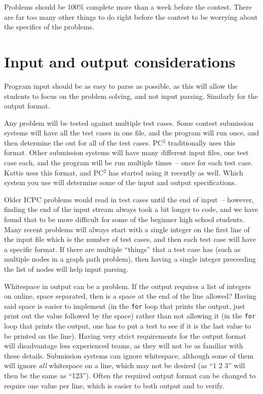 \documentclass[11pt,twoside,letterpaper]{book}
\begin{document}
Problems should be 100\% complete more than a week before the
contest. There are far too many other things to do right before the
contest to be worrying about the specifics of the problems.


\section{Input and output considerations}
\label{sec:input-types}

Program input should be as easy to parse as possible, as this will
allow the students to focus on the problem solving, and not input
parsing.  Similarly for the output format.

Any problem will be tested against multiple test cases.  Some contest
submission systems will have all the test cases in one file, and the
program will run once, and then determine the out for all of the test
cases.  PC$^2$ traditionally uses this format.  Other submission
systems will have many different input files, one test case each, and
the program will be run multiple times~-- once for each test case.
Kattis uses this format, and PC$^2$ has started using it recently as
well.  Which system you use will determine some of the input and
output specifications.

Older ICPC problems would read in test cases until the end of input~--
however, finding the end of the input stream always took a bit longer
to code, and we have found that to be more difficult for some of the
beginner high school students.  Many recent problems will always start
with a single integer on the first line of the input file which is the
number of test cases, and then each test case will have a specific
format.  If there are multiple ``things'' that a test case has (such
as multiple nodes in a graph path problem), then having a single
integer preceeding the list of nodes will help input parsing.

Whitespace in output can be a problem.  If the output requires a list
of integers on online, space separated, then is a space at the end of
the line allowed?  Having said space is easier to implement (in the
{\tt for} loop that prints the output, just print out the value
followed by the space) rather than not allowing it (in the {\tt for}
loop that prints the output, one has to put a test to see if it is the
last value to be printed on the line).  Having very strict
requirements for the output format will disadvantage less experienced
teams, as they will not be as familiar with these details.  Submission
systems can ignore whitespace, although some of them will ignore {\em
  all} whitespace on a line, which may not be desired (as ``1 2 3''
will then be the same as ``123'').  Often the required output format
can be changed to require one value per line, which is easier to both
output and to verify.
\end{document}
